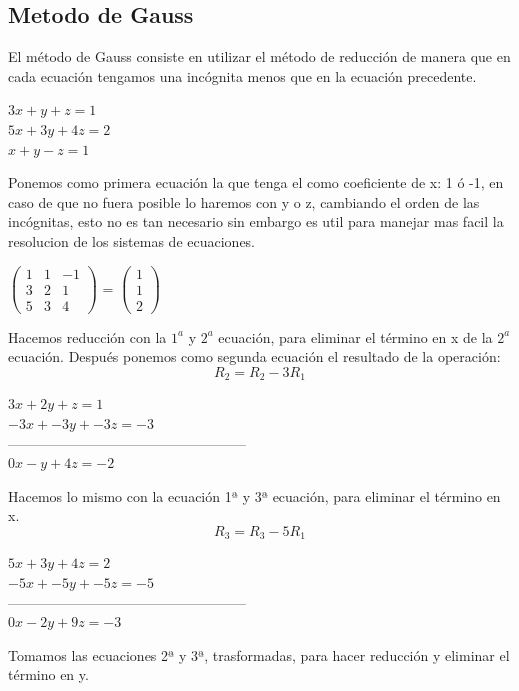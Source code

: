\documentclass{article}
\begin{document}
\begin{multicols}{2}
\section{Metodo de Gauss}
\label{sec:met}
El método de Gauss consiste en utilizar el método de reducción de manera que en cada ecuación tengamos una incógnita menos que en la ecuación precedente.
\begin{center}
$3x+y+z=1$
\\
$5x+3y+4z=2$
\\
$x+y-z=1$

\end{center}
 Ponemos como primera ecuación la que tenga el como coeficiente de x: 1 ó -1, en caso de que no fuera posible lo haremos con y o z, cambiando el orden de las incógnitas, esto no es tan necesario sin embargo es util para manejar mas facil la resolucion de los sistemas de ecuaciones.
\begin{center} 
$\left( \begin{array}{ccc}
1 & 1 & -1 \\
3 & 2 & 1  \\
5 & 3 & 4  
\end{array} \right)
$
=
$\left( \begin{array}{c}
	1 \\
	1 \\
	2 
\end{array} \right)
$
\end{center}
Hacemos reducción con la $1^{a}$ y $2^{a}$ ecuación, para eliminar el término en x de la $2^{a}$ ecuación. Después ponemos como segunda ecuación el resultado de la operación:
\begin{equation}
R_{2}=R_{2}-3R_{1}
\end{equation}

\begin{center}
$3x+2y+z=1$
\\
$-3x+-3y+-3z=-3$
\\
---------------------------------------------------
\\
$0x - y + 4z = -2$
\end{center}

Hacemos lo mismo con la ecuación 1ª y 3ª ecuación, para eliminar el término en x.
\begin{equation}
R_{3}=R_{3}-5R_{1}
\end{equation}

\begin{center}
$5x+3y+4z=2$
\\
$-5x+-5y+-5z=-5$
\\
---------------------------------------------------
\\
$0x - 2y + 9z = -3$
\end{center}
Tomamos las ecuaciones 2ª y 3ª, trasformadas, para hacer reducción y eliminar el término en y.


\end{multicols}
\end{document}
